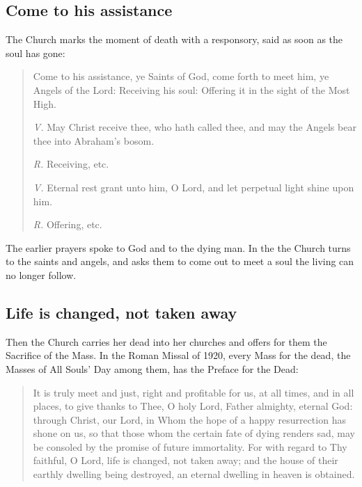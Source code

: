 \subsection{Come to his assistance}

The Church marks the moment of death with a responsory, said as soon as the soul has gone:

\begin{quote}
Come to his assistance, ye Saints of God, come forth to meet him, ye Angels of the Lord: Receiving his soul: Offering it in the sight of the Most High.

\emph{V.} May Christ receive thee, who hath called thee, and may the Angels bear thee into Abraham's bosom.

\emph{R.} Receiving, etc.

\emph{V.} Eternal rest grant unto him, O Lord, and let perpetual light shine upon him.

\emph{R.} Offering, etc.
\end{quote}

\noindent The earlier prayers spoke to God and to the dying man. In the  the Church turns to the saints and angels, and asks them to come out to meet a soul the living can no longer follow.

\subsection{Life is changed, not taken away}

Then the Church carries her dead into her churches and offers for them the Sacrifice of the Mass. In the Roman Missal of 1920, every Mass for the dead, the Masses of All Souls' Day among them, has the Preface for the Dead:

\begin{quote}
It is truly meet and just, right and profitable for us, at all times, and in all places, to give thanks to Thee, O holy Lord, Father almighty, eternal God: through Christ, our Lord, in Whom the hope of a happy resurrection has shone on us, so that those whom the certain fate of dying renders sad, may be consoled by the promise of future immortality. For with regard to Thy faithful, O Lord, life is changed, not taken away; and the house of their earthly dwelling being destroyed, an eternal dwelling in heaven is obtained.
\end{quote}

